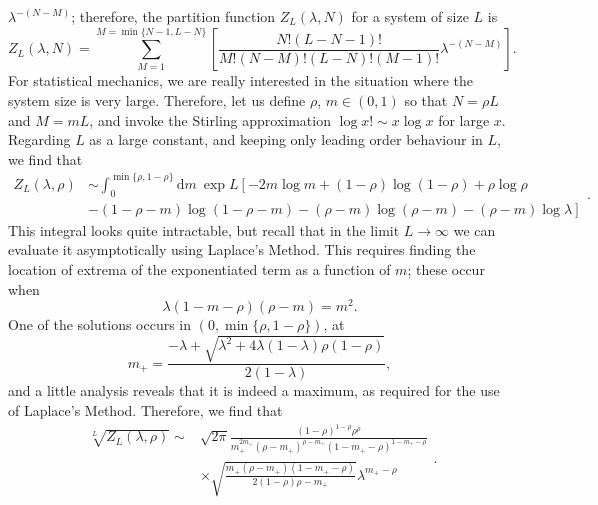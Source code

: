 $\lambda^{-(N-M)}$; therefore, the partition function $Z_L (\lambda, N)$ for a system of size $L$ is
\begin{equation}
 Z_L (\lambda, N) = \sum_{M=1}^{M=\min{ \{ N-1, L-N \} }} \left[ \frac{N!(L-N-1)!}{M!(N-M)!(L-N)!(M-1)!}
 \lambda^{-(N-M)} \right].
\end{equation}
For statistical mechanics, we are really interested in the situation where the system size is very
large. Therefore, let us define $\rho$, $m \in (0, 1)$ so that $N = \rho L$ and $M = mL$, and invoke
the Stirling approximation $\log{x!} \sim x \log{x}$ for large $x$. Regarding $L$ as a large 
constant, and keeping only leading order behaviour in $L$, we find that 
\begin{equation}
\begin{split}
 Z_L (\lambda, \rho) &\sim \int_{0}^{\min{\{ \rho, 1-\rho \}}} \! \mathrm{d}m \
 \exp{L \left[-2m \log{m} + (1-\rho)\log{(1-\rho)} + \rho \log{\rho} \right.} \\
 & \left. -(1-\rho-m)\log{(1-\rho-m)}
 -(\rho-m)\log{(\rho-m)} - (\rho-m)\log \lambda \right]
 \end{split}.
\end{equation}
This integral looks quite intractable, but recall that in the limit $L \rightarrow \infty$ we can
evaluate it asymptotically using Laplace's Method. This requires finding the location of
extrema of the exponentiated term as a function of $m$; these occur when
\begin{equation}
 \lambda(1-m-\rho)(\rho-m) = m^2 .
\end{equation}
One of the solutions occurs in $(0, \min{\{\rho, 1-\rho\}})$, at 
\begin{equation}
 m_+ = \frac{-\lambda+\sqrt{\lambda^2 + 4\lambda(1-\lambda)\rho(1-\rho)}}{2(1-\lambda)},
\end{equation}
and a little analysis reveals that
it is indeed a maximum, as required for the use of Laplace's Method. Therefore, we find that
\begin{equation}
\begin{split}
\sqrt[L]{Z_L (\lambda, \rho)} \sim &\sqrt{2 \pi } \frac{  (1-\rho )^{1-\rho } \rho ^{\rho }}{
m_+^{2 m_+} \left(\rho -m_+\right)^{\rho-m_+} \left(1-m_+-\rho
   \right)^{1 - m_+ - \rho}}  \\ 
   & \times \sqrt{\frac{m_+
   \left(\rho -m_+\right) \left(1- m_+ -\rho\right)}{ 2 (1-\rho) \rho - m_+}} \lambda
   ^{m_+-\rho }
   \end{split}.
\end{equation}
